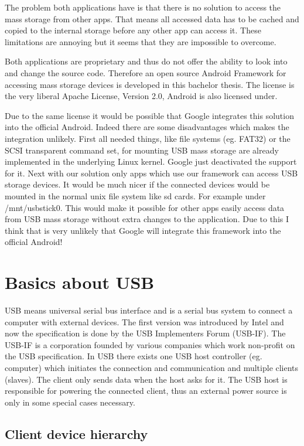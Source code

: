 The problem both applications have is that there is no solution to access the mass storage from other apps. That means all accessed data has to be cached and copied to the internal storage before any other app can access it. These limitations are annoying but it seems that they are impossible to overcome.

Both applications are proprietary and thus do not offer the ability to look into and change the source code. Therefore an open source Android Framework for accessing mass storage devices is developed in this bachelor thesis. The license is the very liberal Apache License, Version 2.0, Android is also licensed under.

Due to the same license it would be possible that Google integrates this solution into the official Android. Indeed there are some disadvantages which makes the integration unlikely. First all needed things, like file systems (eg. FAT32) or the SCSI transparent command set, for mounting USB mass storage are already implemented in the underlying Linux kernel. Google just deactivated the support for it. Next with our solution only apps which use our framework can access USB storage devices. It would be much nicer if the connected devices would be mounted in the normal unix file system like sd cards. For example under /mnt/usbstick0. This would make it possible for other apps easily access data from USB mass storage without extra changes to the application. Due to this I think that is very unlikely that Google will integrate this framework into the official Android!
 
\chapter{Basics about USB}

USB means universal serial bus interface and is a serial bus system to connect a computer with external devices. The first version was introduced by Intel and now the specification is done by the USB Implementers Forum (USB-IF). The USB-IF is a corporation founded by various companies which work non-profit on the USB specification. In USB there exists one USB host controller (eg. computer) which initiates the connection and communication and multiple clients (slaves). The client only sends data when the host asks for it. The USB host is responsible for powering the connected client, thus an external power source is only in some special cases necessary.

\section{Client device hierarchy}

